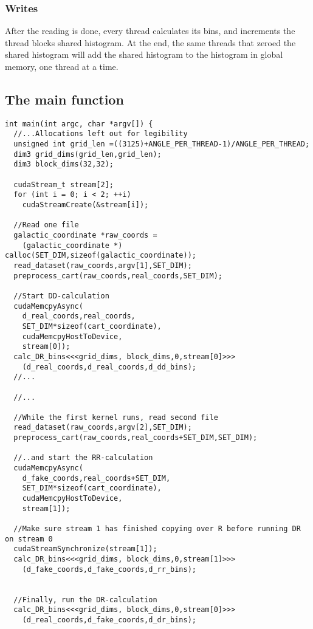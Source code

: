 \documentclass[a4paper,titlepage,12pt]{article}
\begin{document}
\begin{description}[left = \parindent]
\subsubsection{Writes}

After the reading is done, every thread calculates its bins, and increments the thread blocks shared histogram.
At the end, the same threads that zeroed the shared histogram will add the shared histogram to the histogram in global memory, one thread at a time.

\subsection{The main function}

\begin{lstlisting}[caption=The main function]
int main(int argc, char *argv[]) {
  //...Allocations left out for legibility
  unsigned int grid_len =((3125)+ANGLE_PER_THREAD-1)/ANGLE_PER_THREAD;
  dim3 grid_dims(grid_len,grid_len);
  dim3 block_dims(32,32);

  cudaStream_t stream[2];
  for (int i = 0; i < 2; ++i)
    cudaStreamCreate(&stream[i]);

  //Read one file
  galactic_coordinate *raw_coords =
    (galactic_coordinate *) calloc(SET_DIM,sizeof(galactic_coordinate));
  read_dataset(raw_coords,argv[1],SET_DIM);
  preprocess_cart(raw_coords,real_coords,SET_DIM);

  //Start DD-calculation
  cudaMemcpyAsync(
  	d_real_coords,real_coords,
	SET_DIM*sizeof(cart_coordinate),
	cudaMemcpyHostToDevice,
	stream[0]);
  calc_DR_bins<<<grid_dims, block_dims,0,stream[0]>>>
    (d_real_coords,d_real_coords,d_dd_bins);
  //...

  //...

  //While the first kernel runs, read second file
  read_dataset(raw_coords,argv[2],SET_DIM);
  preprocess_cart(raw_coords,real_coords+SET_DIM,SET_DIM);

  //..and start the RR-calculation
  cudaMemcpyAsync(
    d_fake_coords,real_coords+SET_DIM,
    SET_DIM*sizeof(cart_coordinate),
    cudaMemcpyHostToDevice,
    stream[1]);

  //Make sure stream 1 has finished copying over R before running DR on stream 0
  cudaStreamSynchronize(stream[1]);
  calc_DR_bins<<<grid_dims, block_dims,0,stream[1]>>>
    (d_fake_coords,d_fake_coords,d_rr_bins);


  //Finally, run the DR-calculation
  calc_DR_bins<<<grid_dims, block_dims,0,stream[0]>>>
    (d_real_coords,d_fake_coords,d_dr_bins);


\end{lstlisting}
\end{description}
\end{document}
